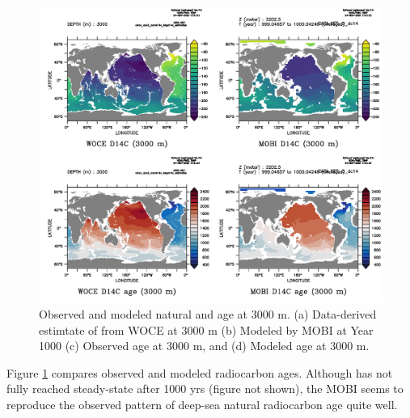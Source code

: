 \documentclass[a4paper]{article}
\begin{document}
\begin{enumerate}
\begin{figure}[h!]   %
   \centering
   \includegraphics[scale=0.5]{MOBI_WOCE_C14.pdf}
   \caption[]{Observed and modeled natural \Delta{} and  age at 3000 m. (a) Data-derived estimtate of \Delta{} from WOCE \citep{Key04} at 3000 m (b) Modeled  \Delta{} by MOBI at Year 1000 (c) Observed  age at 3000 m, and (d) Modeled  age at 3000 m.}
   \label{fig:c14_mobi}
\end{figure}

Figure \ref{fig:c14_mobi} compares observed and modeled radiocarbon ages. Although  has not fully reached steady-state after 1000 yrs (figure not shown), the MOBI seems to reproduce the observed pattern of deep-sea natural radiocarbon age quite well. 


\end{enumerate}
\end{document}
